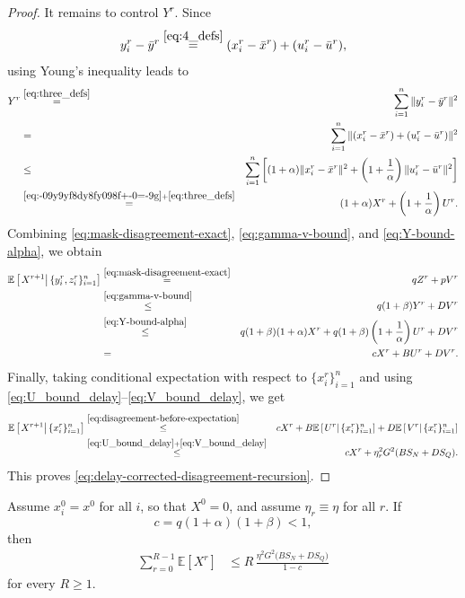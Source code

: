 \documentclass{article}
\newcommand{\Exp}[1]{{\mathbb{E}} \left[ #1 \right]}
\newcommand{\ExpCond}[2]{{\mathbb{E}}\left[\left.#1\right\vert#2\right]}
\theoremstyle{plain}
\theoremstyle{definition}
\begin{document}
\begin{proof}
It remains to control \(Y^r\). Since
\[
y_i^r-\bar y^r
\overset{\eqref{eq:4_defs}}{=}
(x_i^r-\bar x^r)+(u_i^r-\bar u^r),
\]
using Young's inequality leads to \begin{eqnarray}
Y^r
&\overset{\eqref{eq:three_defs}}{=}&
\sum_{i=1}^n\|y_i^r-\bar y^r\|^2
\notag\\
&=&
\sum_{i=1}^n
\|(x_i^r-\bar x^r)+(u_i^r-\bar u^r)\|^2
\notag\\
&\leq &
\sum_{i=1}^n \left[
(1+\alpha)\|x_i^r-\bar x^r\|^2 +\left(1+\frac1\alpha\right) \|u_i^r-\bar u^r\|^2 \right]
\notag\\
&\overset{\eqref{eq:-09y9yf8dy8fy098f+-0=-9g}+\eqref{eq:three_defs}}{=}&
(1+\alpha)X^{r}
+
\left(1+\frac1\alpha\right)
U^r.
\label{eq:Y-bound-alpha}
\end{eqnarray}
Combining \eqref{eq:mask-disagreement-exact}, \eqref{eq:gamma-v-bound}, and
\eqref{eq:Y-bound-alpha}, we obtain
\begin{eqnarray}
\ExpCond{X^{r+1}}{\{y_i^r,z_i^r\}_{i=1}^n}
&\overset{\eqref{eq:mask-disagreement-exact}}{=}&
qZ^r+pV^r
\notag\\
&\overset{\eqref{eq:gamma-v-bound}}{\leq}&
q(1+\beta)Y^r+DV^r
\notag\\
&\overset{\eqref{eq:Y-bound-alpha}}{\leq}&
q(1+\beta)(1+\alpha)X^{r}
+
q(1+\beta)\left(1+\frac1\alpha\right)
U^r
+
DV^r
\notag\\
&=&
cX^{r}
+
B U^r
+
DV^r.
\label{eq:disagreement-before-expectation}
\end{eqnarray}
Finally, taking conditional expectation with respect to \(\{x_i^r\}_{i=1}^n\) and using
\eqref{eq:U_bound_delay}--\eqref{eq:V_bound_delay}, we get
\begin{eqnarray}
\ExpCond{X^{r+1}}{\{x_i^r\}_{i=1}^n}
&\overset{\eqref{eq:disagreement-before-expectation}}{\leq}&
cX^{r}
+
B\ExpCond{U^r}{\{x_i^r\}_{i=1}^n}
+
D\ExpCond{V^r}{\{x_i^r\}_{i=1}^n}
\notag\\
&\overset{\eqref{eq:U_bound_delay}+\eqref{eq:V_bound_delay}}{\leq}&
cX^{r}+\eta_r^2G^2(BS_N+DS_Q).
\end{eqnarray}
This proves \eqref{eq:delay-corrected-disagreement-recursion}.
\end{proof}


\begin{corollary}
\label{cor:sum_disagreement}
Assume \(x_i^0=x^0\) for all \(i\), so that \(X^0=0\), and assume \(\eta_r\equiv \eta\) for all $r$.
If
\[
c=q(1+\alpha)(1+\beta)<1,
\]
then
\begin{align}
\sum_{r=0}^{R-1}\Exp{X^{r}}
&\leq
R\,\frac{\eta^2G^2\bigl(BS_N + DS_Q\bigr)}{1-c}
\label{eq:sum_disagreement_corrected_delay}
\end{align}
for every \(R\ge 1\).
\end{corollary}
\end{document}

